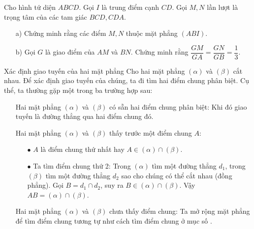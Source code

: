 \begin{vd}
	Cho hình tứ diện $ABCD$. Gọi $I$ là trung điểm cạnh $CD$. Gọi $M, N$ lần lượt là trọng tâm của các tam giác $BCD, CDA$.
	\begin{itemize}
		\item[a)] Chứng minh rằng các điểm $M, N$ thuộc mặt phẳng $\left(ABI\right)$.
		\item[b)] Gọi $G$ là giao điểm của $AM$ và $BN$. Chứng minh rằng $\dfrac{GM}{GA}=\dfrac{GN}{GB}=\dfrac{1}{3}$.
		\end{itemize}
\end{vd} 
\begin{dang}{Xác định giao tuyến của hai mặt phẳng}
	Cho hai mặt phẳng $(\alpha)$ và $(\beta)$ cắt nhau. Để xác định giao tuyến của chúng, ta đi tìm hai điểm chung phân biệt. Cụ thể, ta thường gặp một trong ba trường hợp sau:
\begin{itemize}
		\item [\ding{172}] Hai mặt phẳng $(\alpha)$ và $(\beta)$ có sẵn hai điểm chung phân biệt: Khi đó giao tuyến là đường thẳng qua hai điểm chung đó.
		\item [\ding{173}] Hai mặt phẳng  $(\alpha)$ và $(\beta)$ thấy trước một điểm chung $A$:
			\begin{itemize}
				\item [$\bullet$] $A$ là điểm chung thứ nhất hay $A \in (\alpha) \cap (\beta)$.
				\item [$\bullet$] Ta tìm điểm chung thứ 2: Trong $ (\alpha)$ tìm một đường thẳng $d_1$, trong $ (\beta)$ tìm một đường thẳng $d_2$ sao cho chúng có thể cắt nhau (đồng phẳng).			Gọi $B = d_1 \cap d_2$, suy ra $B \in (\alpha) \cap (\beta)$. Vậy $AB=(\alpha) \cap (\beta)$.
		\end{itemize}
		\item [\ding{174}] Hai mặt phẳng  $(\alpha)$ và $(\beta)$ chưa thấy điểm chung: Ta mở rộng mặt phẳng để tìm điểm chung tương tự như cách tìm điểm chung ở mục số .
	\end{itemize}
\end{dang}

